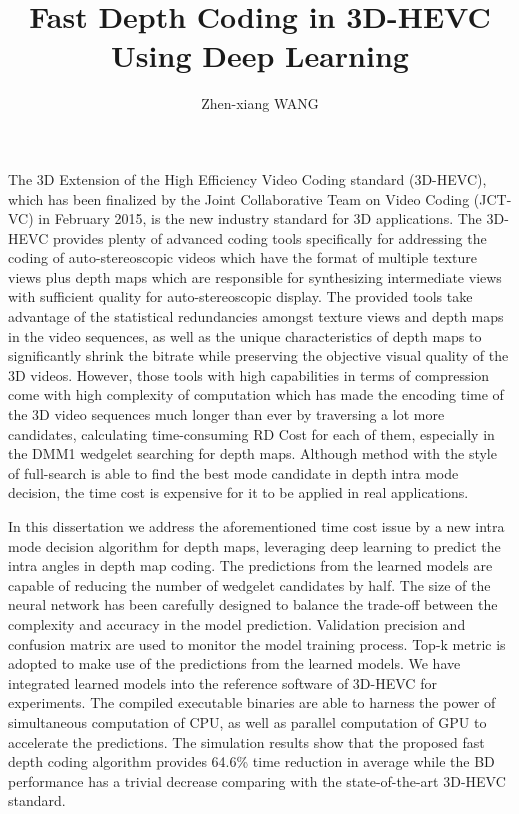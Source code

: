 \documentclass{report}
\begin{document}
    \title{Fast Depth Coding in 3D-HEVC
    Using Deep Learning}
    \author{Zhen-xiang WANG}
    \beforepreface
    The 3D Extension of the High Efficiency Video Coding standard (3D-HEVC),
    which has been finalized by the Joint Collaborative Team on Video Coding
    (JCT-VC) in February 2015, is the new industry standard for 3D applications.
    The 3D-HEVC provides plenty of advanced coding tools specifically
    for addressing the coding of auto-stereoscopic videos which have the format
    of multiple texture views plus depth maps which are responsible
    for synthesizing intermediate views with sufficient quality for
    auto-stereoscopic display.
    The provided tools take advantage of the statistical redundancies amongst
    texture views and depth maps in the video sequences, as well as the unique
    characteristics of depth maps to significantly shrink the bitrate
    while preserving the objective visual quality of the
    3D videos.
    However, those tools with high capabilities in terms of compression come
    with high complexity of computation which has made the encoding time
    of the 3D video sequences much longer than ever by traversing a lot more
    candidates, calculating time-consuming RD Cost for each of them,
    especially in the DMM1 wedgelet searching for depth maps.
    Although method with the style of full-search is able to find the best
    mode candidate in depth intra mode decision, the time cost is expensive
    for it to be applied in real applications.

    In this dissertation we address the aforementioned time cost issue by a new
    intra mode decision algorithm for depth maps, leveraging 
    deep learning to predict the intra angles 
    in depth map coding.
    The predictions from the learned models are capable of
    reducing the number of wedgelet candidates by half.
    The size of the neural network has been carefully designed to balance
    the trade-off between the complexity and accuracy in the model prediction.
    Validation precision and confusion matrix are used to monitor 
    the model training process.
    Top-k metric is adopted to make use of the predictions
    from the learned models.
    We have integrated learned models into the reference software of
    3D-HEVC for experiments.
    The compiled executable binaries are able to harness
    the power of simultaneous computation of CPU, as well as
    parallel computation of GPU to accelerate the predictions.
    The simulation results show that the proposed 
    fast depth coding algorithm
    provides 64.6\% time reduction in average while the
    BD performance has a trivial decrease comparing with 
    the state-of-the-art 3D-HEVC standard.
\end{document}
